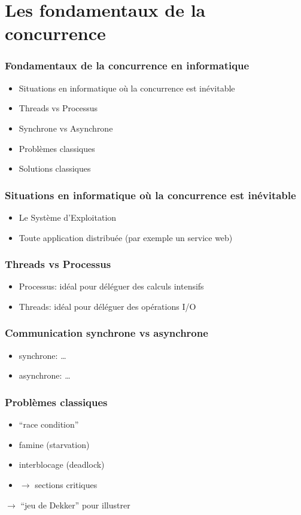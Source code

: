 \documentclass{beamer}
\begin{document}
\section{Les fondamentaux de la concurrence}
\begin{frame}
  \frametitle{Fondamentaux de la concurrence en informatique}
  \begin{itemize}
  \item Situations en informatique où la concurrence est inévitable
  \item Threads vs Processus
  \item Synchrone vs Asynchrone
  \item Problèmes classiques
  \item Solutions classiques
  \end{itemize}
\end{frame}
\begin{frame}
  \frametitle{Situations en informatique où la concurrence est inévitable}
  \begin{itemize}
  \item Le Système d'Exploitation
  \item Toute application distribuée (par exemple un service web)
  \end{itemize}
\end{frame}
\begin{frame}
  \frametitle{Threads vs Processus}
  \begin{itemize}
  \item Processus: idéal pour déléguer des calculs intensifs
  \item Threads: idéal pour déléguer des opérations I/O
  \end{itemize}
\end{frame}
\begin{frame}
  \frametitle{Communication synchrone vs asynchrone}
  \begin{itemize}
  \item synchrone: \ldots
  \item asynchrone: \ldots
  \end{itemize}
\end{frame}
\begin{frame}
  \frametitle{Problèmes classiques}
  \begin{itemize}
  \item ``race condition''
  \item famine (starvation)
  \item interblocage (deadlock)
  \item $\rightarrow$ sections critiques
  \end{itemize}
  $\rightarrow$ ``jeu de Dekker'' pour illustrer 
\end{frame}
\end{document}
